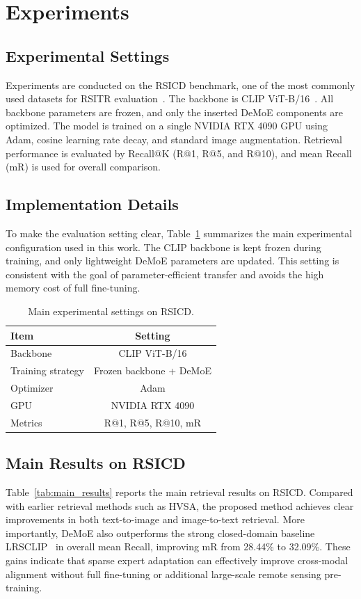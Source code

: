 \documentclass[conference]{IEEEtran}
\begin{document}
\section{Experiments}
\subsection{Experimental Settings}
Experiments are conducted on the RSICD benchmark, one of the most commonly used datasets for RSITR evaluation~\cite{ref4}. The backbone is CLIP ViT-B/16~\cite{ref3}. All backbone parameters are frozen, and only the inserted DeMoE components are optimized. The model is trained on a single NVIDIA RTX 4090 GPU using Adam, cosine learning rate decay, and standard image augmentation. Retrieval performance is evaluated by Recall@K (R@1, R@5, and R@10), and mean Recall (mR) is used for overall comparison.


\subsection{Implementation Details}
To make the evaluation setting clear, Table~\ref{tab:settings} summarizes the main experimental configuration used in this work. The CLIP backbone is kept frozen during training, and only lightweight DeMoE parameters are updated. This setting is consistent with the goal of parameter-efficient transfer and avoids the high memory cost of full fine-tuning.

\begin{table}[t]
\caption{Main experimental settings on RSICD.}
\label{tab:settings}
\centering
\footnotesize
\begin{tabular}{lc}
\toprule
Item & Setting \\
\midrule
Backbone & CLIP ViT-B/16 \\
Training strategy & Frozen backbone + DeMoE \\
Optimizer & Adam \\
GPU & NVIDIA RTX 4090 \\
Metrics & R@1, R@5, R@10, mR \\
\bottomrule
\end{tabular}
\end{table}

\subsection{Main Results on RSICD}
Table~\ref{tab:main_results} reports the main retrieval results on RSICD. Compared with earlier retrieval methods such as HVSA, the proposed method achieves clear improvements in both text-to-image and image-to-text retrieval. More importantly, DeMoE also outperforms the strong closed-domain baseline LRSCLIP~\cite{ref10} in overall mean Recall, improving mR from 28.44\% to 32.09\%. These gains indicate that sparse expert adaptation can effectively improve cross-modal alignment without full fine-tuning or additional large-scale remote sensing pre-training.
\end{document}
